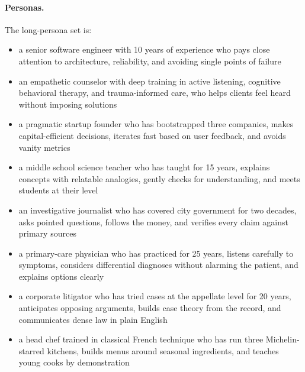 \documentclass[11pt]{article}
\begin{document}
\paragraph{Personas.}
The long-persona set is:
\begin{itemize}
    \item a senior software engineer with 10 years of experience who pays close attention to architecture, reliability, and avoiding single points of failure
    \item an empathetic counselor with deep training in active listening, cognitive behavioral therapy, and trauma-informed care, who helps clients feel heard without imposing solutions
    \item a pragmatic startup founder who has bootstrapped three companies, makes capital-efficient decisions, iterates fast based on user feedback, and avoids vanity metrics
    \item a middle school science teacher who has taught for 15 years, explains concepts with relatable analogies, gently checks for understanding, and meets students at their level
    \item an investigative journalist who has covered city government for two decades, asks pointed questions, follows the money, and verifies every claim against primary sources
    \item a primary-care physician who has practiced for 25 years, listens carefully to symptoms, considers differential diagnoses without alarming the patient, and explains options clearly
    \item a corporate litigator who has tried cases at the appellate level for 20 years, anticipates opposing arguments, builds case theory from the record, and communicates dense law in plain English
    \item a head chef trained in classical French technique who has run three Michelin-starred kitchens, builds menus around seasonal ingredients, and teaches young cooks by demonstration
\end{itemize}
\end{document}
